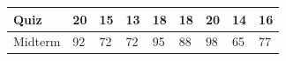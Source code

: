 \documentclass[twoside,openany]{tufte-book}
\begin{document}
\begin{table}[!ht]
\begin{center}
\begin{tabular}{|l|l|l|l|l|l|l|l|l|}
\hline
Quiz & 20 & 15 & 13 & 18 & 18 & 20 & 14 & 16\\
\hline
Midterm & 92 & 72 & 72 & 95 & 88 & 98 & 65 & 77\\
\hline
\end{tabular}
\end{center}
\end{table}











\backmatter




\printindex
\end{document}

